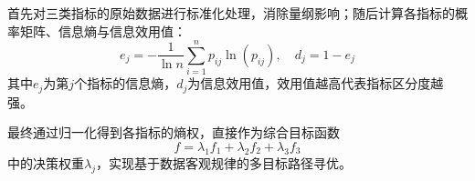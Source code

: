 \documentclass{article}
\begin{document}
	首先对三类指标的原始数据进行标准化处理，消除量纲影响；随后计算各指标的概率矩阵、信息熵与信息效用值：
	\[
	e_j = -\frac{1}{\ln n}\sum_{i=1}^n p_{ij}\ln(p_{ij}),\quad d_j = 1 - e_j
	\]
	其中$e_j$为第$j$个指标的信息熵，$d_j$为信息效用值，效用值越高代表指标区分度越强。
	
	最终通过归一化得到各指标的熵权，直接作为综合目标函数
	\[
	f = \lambda_1 f_1 + \lambda_2 f_2 + \lambda_3 f_3
	\]
	中的决策权重$\lambda_j$，实现基于数据客观规律的多目标路径寻优。
	
\end{document}
